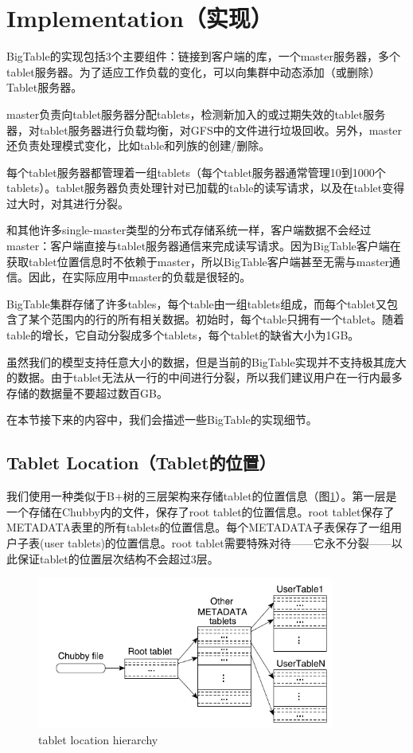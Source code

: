 \documentclass{article}
\begin{document}
\section{Implementation（实现）}
BigTable的实现包括3个主要组件：链接到客户端的库，一个master服务器，多个tablet服务器。为了适应工作负载的变化，可以向集群中动态添加（或删除）Tablet服务器。\par
master负责向tablet服务器分配tablets，检测新加入的或过期失效的tablet服务器，对tablet服务器进行负载均衡，对GFS中的文件进行垃圾回收。另外，master还负责处理模式变化，比如table和列族的创建/删除。\par
每个tablet服务器都管理着一组tablets（每个tablet服务器通常管理10到1000个tablets）。tablet服务器负责处理针对已加载的table的读写请求，以及在tablet变得过大时，对其进行分裂。\par
和其他许多single-master类型的分布式存储系统一样，客户端数据不会经过master：客户端直接与tablet服务器通信来完成读写请求。因为BigTable客户端在获取tablet位置信息时不依赖于master，所以BigTable客户端甚至无需与master通信。因此，在实际应用中master的负载是很轻的。\par
BigTable集群存储了许多tables，每个table由一组tablets组成，而每个tablet又包含了某个范围内的行的所有相关数据。初始时，每个table只拥有一个tablet。随着table的增长，它自动分裂成多个tablets，每个tablet的缺省大小为1GB。\par
虽然我们的模型支持任意大小的数据，但是当前的BigTable实现并不支持极其庞大的数据。由于tablet无法从一行的中间进行分裂，所以我们建议用户在一行内最多存储的数据量不要超过数百GB。\par
在本节接下来的内容中，我们会描述一些BigTable的实现细节。

\subsection{Tablet Location（Tablet的位置）}
我们使用一种类似于B+树的三层架构来存储tablet的位置信息（图\ref{fig:tablet_location_hierarchy}）。第一层是一个存储在Chubby内的文件，保存了root tablet的位置信息。root tablet保存了METADATA表里的所有tablets的位置信息。每个METADATA子表保存了一组用户子表(user tablets)的位置信息。root tablet需要特殊对待——它永不分裂——以此保证tablet的位置层次结构不会超过3层。

\begin{figure}[htbp]
    \centering\includegraphics[height=5cm]{images/tablet_location_hierarchy.png}
    \caption{tablet location hierarchy}
    \label{fig:tablet_location_hierarchy}
\end{figure}
\end{document}
